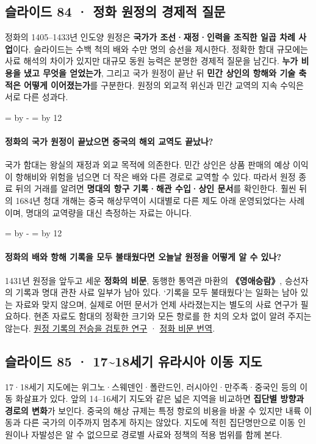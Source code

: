 \documentclass[10pt,a4paper]{article}
\newcommand{\ReserveQuestionSpace}{%
  \par\begingroup
  \dimen0=\pagegoal \advance\dimen0 by -\pagetotal
  \dimen2=\baselineskip \multiply\dimen2 by 12
  \ifdim\dimen0<\dimen2 \newpage\fi
  \endgroup}
\begin{document}
\subsection{슬라이드 84 · 정화 원정의 경제적 질문}
정화의 1405–1433년 인도양 원정은 \textbf{국가가 조선·재정·인력을 조직한 일곱 차례 사업}이다. 슬라이드는 수백 척의 배와 수만 명의 승선을 제시한다. 정확한 함대 규모에는 사료 해석의 차이가 있지만 대규모 동원 능력은 분명한 경제적 질문을 남긴다. \textbf{누가 비용을 냈고 무엇을 얻었는가}, 그리고 국가 원정이 끝난 뒤 \textbf{민간 상인의 항해와 기술 축적은 어떻게 이어졌는가}를 구분한다. 원정의 외교적 위신과 민간 교역의 지속 수익은 서로 다른 성과다.\par

\ReserveQuestionSpace
\paragraph{정화의 국가 원정이 끝났으면 중국의 해외 교역도 끝났나?}
국가 함대는 왕실의 재정과 외교 목적에 의존한다. 민간 상인은 상품 판매의 예상 이익이 항해비와 위험을 넘으면 더 작은 배와 다른 경로로 교역할 수 있다. 따라서 원정 종료 뒤의 거래를 알려면 \textbf{명대의 항구 기록·해관 수입·상인 문서}를 확인한다. 훨씬 뒤의 1684년 청대 개해는 중국 해상무역이 시대별로 다른 제도 아래 운영되었다는 사례이며, 명대의 교역량을 대신 측정하는 자료는 아니다.\par

\ReserveQuestionSpace
\paragraph{정화의 배와 항해 기록을 모두 불태웠다면 오늘날 원정을 어떻게 알 수 있나?}
1431년 원정을 앞두고 세운 \textbf{정화의 비문}, 동행한 통역관 마환의 \textbf{《영애승람》}, 승선자의 기록과 명대 관찬 사료 일부가 남아 있다. ‘기록을 모두 불태웠다’는 일화는 남아 있는 자료와 맞지 않으며, 실제로 어떤 문서가 언제 사라졌는지는 별도의 사료 연구가 필요하다. 현존 자료도 함대의 정확한 크기와 모든 항로를 한 치의 오차 없이 알려 주지는 않는다. \href{https://www.cuhk.edu.hk/ics/journal/articles/v51p067.pdf}{원정 기록의 전승을 검토한 연구} · \href{https://edspace.american.edu/justinjacobs/wp-content/uploads/sites/986/2022/12/31-Historical-Accounts-of-Zheng-He.pdf}{정화 비문 번역}.\par

\subsection{슬라이드 85 · 17\textasciitilde{}18세기 유라시아 이동 지도}
17·18세기 지도에는 위그노·스웨덴인·폴란드인, 러시아인·만주족·중국인 등의 이동 화살표가 있다. 앞의 14–16세기 지도와 같은 넓은 지역을 비교하면 \textbf{집단별 방향과 경로의 변화}가 보인다. 중국의 해상 규제는 특정 항로의 비용을 바꿀 수 있지만 내륙 이동과 다른 국가의 이주까지 멈추게 하지는 않았다. 지도에 적힌 집단명만으로 이동 인원이나 자발성은 알 수 없으므로 경로별 사료와 정책의 적용 범위를 함께 본다.\par
\end{document}
